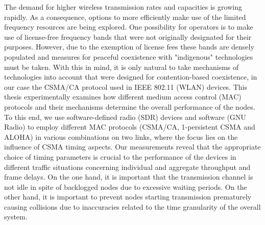 The demand for higher wireless transmission rates and capacities is growing rapidly. As a consequence, options to more efficiently make use of the limited frequency resources are being explored. One possibility for operators is to make use of license-free frequency bands that were not originally designated for their purposes. However, due to the exemption of license fees these bands are densely populated and measures for peaceful coexistence with "indigenous" technologies must be taken. With this in mind, it is only natural to take mechanisms of technologies into account that were designed for contention-based coexistence, in our case the CSMA/CA protocol used in IEEE 802.11 (WLAN) devices. 
This thesis experimentally examines how different medium access control (MAC) protocols and their mechanisms determine the overall performance of the nodes. To this end, we use software-defined radio (SDR) devices and software (GNU Radio) to employ different MAC protocols (CSMA/CA, 1-persistent CSMA and ALOHA) in various combinations on two links, where the focus lies on the influence of CSMA timing aspects. 
Our measurements reveal that the appropriate choice of timing parameters is crucial to the performance of the devices in different traffic situations concerning individual and aggregate throughput and frame delays. On the one hand, it is important that the transmission channel is not idle in spite of backlogged nodes due to excessive waiting periods. On the other hand, it is important to prevent nodes starting transmission prematurely causing collisions due to inaccuracies related to the time granularity of the overall system.  